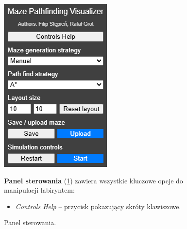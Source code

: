 \documentclass[../doc.tex]{subfiles}
\begin{document}
    \begin{figure}[H]
        \centering
        \begin{minipage}[c]{0.35\textwidth}
            \centering
            \includegraphics[width=\linewidth]{figures/controls.png}
            \caption{Panel sterowania.}
            \label{fig:control_panel}
        \end{minipage}
        \hfill
        \begin{minipage}[c]{0.6\textwidth}
            \textbf{Panel sterowania} (\cref{fig:control_panel}) zawiera wszystkie kluczowe opcje do manipulacji labiryntem:

            \begin{itemize}
                \item \textit{Controls Help} – przycisk pokazujący skróty klawiszowe.
                

\end{itemize}
\end{minipage}
\end{figure}
\end{document}
